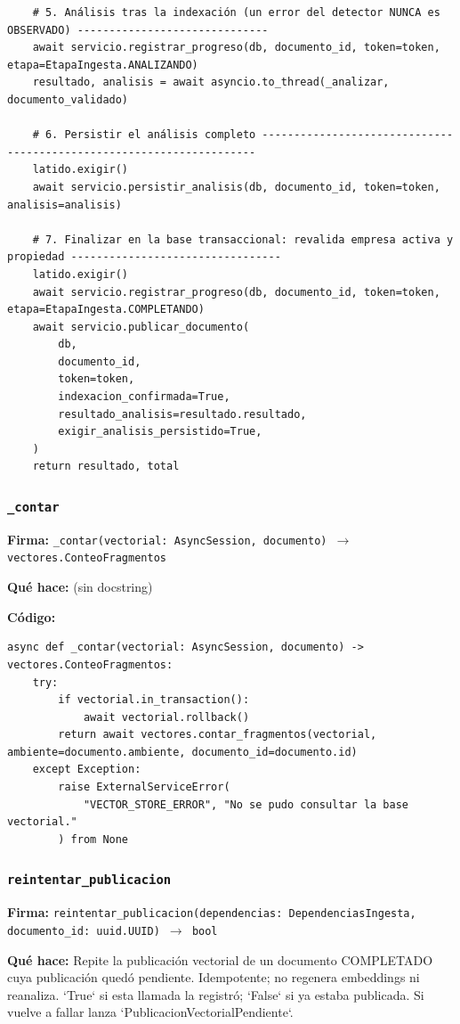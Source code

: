 \documentclass[11pt,a4paper]{article}
\begin{document}
\begin{lstlisting}
    # 5. Análisis tras la indexación (un error del detector NUNCA es OBSERVADO) ------------------------------
    await servicio.registrar_progreso(db, documento_id, token=token, etapa=EtapaIngesta.ANALIZANDO)
    resultado, analisis = await asyncio.to_thread(_analizar, documento_validado)

    # 6. Persistir el análisis completo ---------------------------------------------------------------------
    latido.exigir()
    await servicio.persistir_analisis(db, documento_id, token=token, analisis=analisis)

    # 7. Finalizar en la base transaccional: revalida empresa activa y propiedad ---------------------------------
    latido.exigir()
    await servicio.registrar_progreso(db, documento_id, token=token, etapa=EtapaIngesta.COMPLETANDO)
    await servicio.publicar_documento(
        db,
        documento_id,
        token=token,
        indexacion_confirmada=True,
        resultado_analisis=resultado.resultado,
        exigir_analisis_persistido=True,
    )
    return resultado, total
\end{lstlisting}

\subsubsection*{\texttt{\_contar}}
\textbf{Firma:} \texttt{\_contar(vectorial: AsyncSession, documento) $\rightarrow$ vectores.ConteoFragmentos}

\textbf{Qué hace:} (sin docstring)

\textbf{Código:}
\begin{lstlisting}
async def _contar(vectorial: AsyncSession, documento) -> vectores.ConteoFragmentos:
    try:
        if vectorial.in_transaction():
            await vectorial.rollback()
        return await vectores.contar_fragmentos(vectorial, ambiente=documento.ambiente, documento_id=documento.id)
    except Exception:
        raise ExternalServiceError(
            "VECTOR_STORE_ERROR", "No se pudo consultar la base vectorial."
        ) from None
\end{lstlisting}

\subsubsection*{\texttt{reintentar\_publicacion}}
\textbf{Firma:} \texttt{reintentar\_publicacion(dependencias: DependenciasIngesta, documento\_id: uuid.UUID) $\rightarrow$ bool}

\textbf{Qué hace:} Repite la publicación vectorial de un documento COMPLETADO cuya publicación quedó pendiente. Idempotente;
no regenera embeddings ni reanaliza. `True` si esta llamada la registró; `False` si ya estaba publicada.
Si vuelve a fallar lanza `PublicacionVectorialPendiente`.
\end{document}
